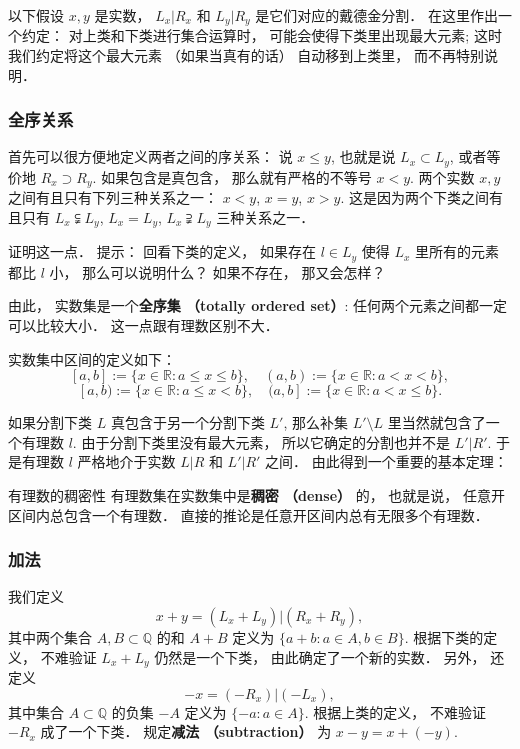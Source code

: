 以下假设 $x,y$ 是实数， $L_x| R_x$ 和 $L_y| R_y$ 是它们对应的戴德金分割． 在这里作出一个约定： 对上类和下类进行集合运算时， 可能会使得下类里出现最大元素; 这时我们约定将这个最大元素 （如果当真有的话） 自动移到上类里， 而不再特别说明．

\subsubsection{全序关系}

首先可以很方便地定义两者之间的序关系： 说 $x\leq y$, 也就是说 $L_x\subset L_y$, 或者等价地 $R_x\supset R_y$. 如果包含是真包含， 那么就有严格的不等号 $x<y$. 两个实数 $x,y$ 之间有且只有下列三种关系之一： $x<y$, $x=y$, $x>y$. 这是因为两个下类之间有且只有 $L_x\subsetneqq L_y$, $L_x=L_y$, $L_x\supsetneqq L_y$ 三种关系之一．

\begin{exercise}{}
证明这一点． 提示： 回看下类的定义， 如果存在 $l\in L_y$ 使得 $L_x$ 里所有的元素都比 $l$ 小， 那么可以说明什么？ 如果不存在， 那又会怎样？
\end{exercise}

由此， 实数集是一个\textbf{全序集 （totally ordered set）}: 任何两个元素之间都一定可以比较大小． 这一点跟有理数区别不大．

实数集中区间的定义如下： 
$$
[a,b]:=\{x\in\mathbb{R}:a\leq x\leq b\},
\quad
(a,b):=\{x\in\mathbb{R}:a< x< b\},
$$
$$
[a,b):=\{x\in\mathbb{R}:a\leq x< b\},
\quad
(a,b]:=\{x\in\mathbb{R}:a< x\leq b\}.
$$

如果分割下类 $L$ 真包含于另一个分割下类 $L'$, 那么补集 $L'\setminus L$ 里当然就包含了一个有理数 $l$. 由于分割下类里没有最大元素， 所以它确定的分割也并不是 $L'|R'$. 于是有理数 $l$ 严格地介于实数 $L|R$ 和 $L'|R'$ 之间． 由此得到一个重要的基本定理：
\begin{theorem}{有理数的稠密性}
有理数集在实数集中是\textbf{稠密 （dense）} 的， 也就是说， 任意开区间内总包含一个有理数． 直接的推论是任意开区间内总有无限多个有理数．
\end{theorem}

\subsubsection{加法}

我们定义
$$
x+y=(L_x+L_y)|(R_x+R_y),
$$
其中两个集合 $A,B\subset\mathbb{Q}$ 的和 $A+B$ 定义为 $\{a+b:a\in A, b\in B\}$. 根据下类的定义， 不难验证 $L_x+L_y$ 仍然是一个下类， 由此确定了一个新的实数． 另外， 还定义
$$
-x=(-R_x)|(-L_x),
$$
其中集合 $A\subset\mathbb{Q}$ 的负集 $-A$ 定义为 $\{-a:a\in A\}$. 根据上类的定义， 不难验证 $-R_x$ 成了一个下类． 规定\textbf{减法 （subtraction）} 为 $x-y=x+(-y)$.

